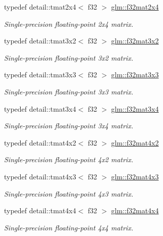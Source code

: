 \begin{DoxyCompactItemize}
typedef detail\-::tmat2x4$<$ f32 $>$ \hyperlink{group__gtc__type__precision_gaf86a2c845d7ced1b3c0c22a0b5b7e3e8}{glm\-::f32mat2x4}
\begin{DoxyCompactList}\small\item\em Single-\/precision floating-\/point 2x4 matrix. \end{DoxyCompactList}\item 
typedef detail\-::tmat3x2$<$ f32 $>$ \hyperlink{group__gtc__type__precision_gadf01336f427b8b6918bcad610cfc2fd6}{glm\-::f32mat3x2}
\begin{DoxyCompactList}\small\item\em Single-\/precision floating-\/point 3x2 matrix. \end{DoxyCompactList}\item 
typedef detail\-::tmat3x3$<$ f32 $>$ \hyperlink{group__gtc__type__precision_ga5784742e2a453a8df85e7453a1386189}{glm\-::f32mat3x3}
\begin{DoxyCompactList}\small\item\em Single-\/precision floating-\/point 3x3 matrix. \end{DoxyCompactList}\item 
typedef detail\-::tmat3x4$<$ f32 $>$ \hyperlink{group__gtc__type__precision_ga6ca7c9195aeb5fdc8a6b8dcba6ce4ab3}{glm\-::f32mat3x4}
\begin{DoxyCompactList}\small\item\em Single-\/precision floating-\/point 3x4 matrix. \end{DoxyCompactList}\item 
typedef detail\-::tmat4x2$<$ f32 $>$ \hyperlink{group__gtc__type__precision_ga0049d706c1dc65ea5212a7b0ce64b0f0}{glm\-::f32mat4x2}
\begin{DoxyCompactList}\small\item\em Single-\/precision floating-\/point 4x2 matrix. \end{DoxyCompactList}\item 
typedef detail\-::tmat4x3$<$ f32 $>$ \hyperlink{group__gtc__type__precision_ga0b80103fc9c41a559c616e3f84dc570f}{glm\-::f32mat4x3}
\begin{DoxyCompactList}\small\item\em Single-\/precision floating-\/point 4x3 matrix. \end{DoxyCompactList}\item 
typedef detail\-::tmat4x4$<$ f32 $>$ \hyperlink{group__gtc__type__precision_gaffefd599ebe609080b8e999aa8df7f83}{glm\-::f32mat4x4}
\begin{DoxyCompactList}\small\item\em Single-\/precision floating-\/point 4x4 matrix. \end{DoxyCompactList}\item 

\end{DoxyCompactItemize}
